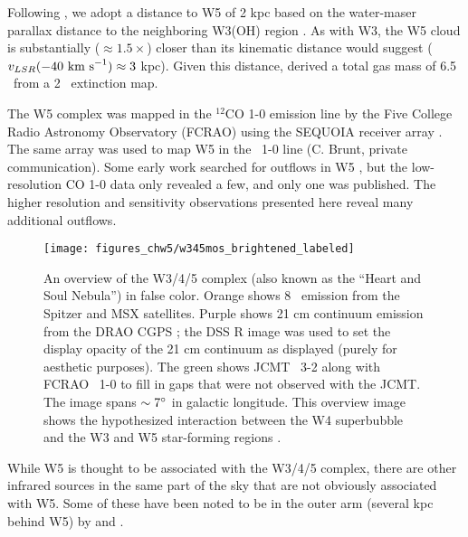 Following \citet{koenig:clustered:2008}, we adopt a distance to W5 of 2 kpc
based on the water-maser parallax distance to the neighboring W3(OH) region
\citep{Hachisuka2006}.  As with W3, the W5 cloud is substantially
($\approx1.5\times$) closer than its kinematic distance would suggest
($v_{LSR}(-40~\textrm{km~s}^{-1})\approx3$ kpc).  Given this distance,
\citet{koenig:clustered:2008} derived a total gas mass of 6.5 \msun\ from
a 2 \um\ extinction map.

The W5 complex was mapped in the $^{12}$CO 1-0 emission line by the Five
College Radio Astronomy Observatory (FCRAO) using the SEQUOIA receiver array
\citep{heyer:ogs:1998}.  The same array was used to map W5 in the \thirteenco\
1-0 line (C. Brunt, private communication).  Some early work searched for
outflows in W5 \citep{bretherton:unbiased:2002}, but the low-resolution CO 1-0
data only revealed a few, and only one was published.  The higher resolution
and sensitivity observations presented here reveal many additional outflows.

\begin{figure*}
  \texttt{[image: figures\_chw5/w345mos\_brightened\_labeled]}
  \caption{An overview of the W3/4/5 complex (also known as the ``Heart and
  Soul Nebula'') in false color. Orange shows 8 \um\ emission from the Spitzer
  and MSX satellites.  Purple shows 21 cm continuum emission from the DRAO CGPS
  \citep{Taylor2003:CGPS}; the DSS R image was used to set the display opacity
  of the 21 cm continuum as displayed (purely for aesthetic purposes).  The
  green shows JCMT \twelveco\ 3-2 along with FCRAO \twelveco\ 1-0 to fill in 
  gaps that were not observed with the JCMT.  The image spans
  $\sim7\mbox{$^\circ$}$ in galactic longitude.  This overview image shows the
  hypothesized interaction between the W4 superbubble and the W3 and W5
  star-forming regions \citep{oey:hierarchical:2005}.}
  \label{fig:color_overview}
\end{figure*}

While W5 is thought to be associated with the W3/4/5 complex, there are other
infrared sources in the same part of the sky that are not obviously associated
with W5.  Some of these have been noted to be in the outer arm (several kpc
behind W5) by \citet{Digel1996} and \citet{Snell2002}.

